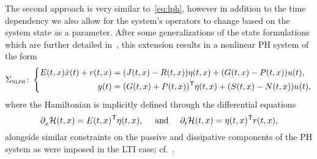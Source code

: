 \begin{remark}
    The second approach is very similar to~\eqref{eq:lph}, however in addition to the time dependency we also allow for the system's operators to change based on the system state as a parameter.
    After some generalizations of the state formulations which are further detailed in~\cite{Mehrmann2022}, this extension results in a nonlinear \ac{PH} system of the form
    \begin{equation}\label{eq:nlph}
        \Sigma_{\msc{nlph}} \colon \left\lbrace
        \begin{aligned}
            E(t, x) \dot{x}(t) + r(t, x) &= (J(t, x) - R(t, x)) \eta(t, x) + (G(t, x) - P(t, x)) u(t), \\
            y(t) &= (G(t, x) + P(t, x))\trans \eta(t, x) + (S(t, x) - N(t, x)) u(t),
        \end{aligned}
        \right.
    \end{equation}
    where the Hamiltonian is implicitly defined through the differential equations
    \begin{equation*}
        \pd{} \mcl{H}(t, x) = E(t, x)\trans \eta(t, x),\quad \text{ and }\quad \pd[t]{} \mcl{H}(t, x) = \eta(t, x)\trans r(t, x),
    \end{equation*}
    alongside similar constraints on the passive and dissipative components of the \ac{PH} system as were imposed in the \ac{LTI} case; cf.~\cite[Definition~4.1]{Mehrmann2022}.
\end{remark}

